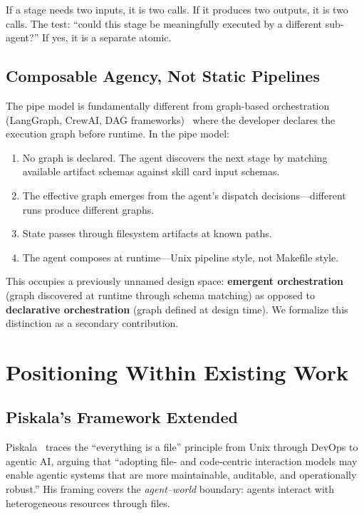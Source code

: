 \documentclass[11pt,a4paper]{article}
\begin{document}
If a stage needs two inputs, it is two calls. If it produces two outputs, it is two calls. The test: ``could this stage be meaningfully executed by a different sub-agent?'' If yes, it is a separate atomic.

\subsection{Composable Agency, Not Static Pipelines}
The pipe model is fundamentally different from graph-based orchestration (LangGraph, CrewAI, DAG frameworks)~\cite{azure2025} where the developer declares the execution graph before runtime. In the pipe model:

\begin{enumerate}[nosep]
  \item No graph is declared. The agent discovers the next stage by matching available artifact schemas against skill card input schemas.
  \item The effective graph emerges from the agent's dispatch decisions---different runs produce different graphs.
  \item State passes through filesystem artifacts at known paths.
  \item The agent composes at runtime---Unix pipeline style, not Makefile style.
\end{enumerate}

This occupies a previously unnamed design space: \textbf{emergent orchestration} (graph discovered at runtime through schema matching) as opposed to \textbf{declarative orchestration} (graph defined at design time). We formalize this distinction as a secondary contribution.

\section{Positioning Within Existing Work}
\label{sec:positioning}

\subsection{Piskala's Framework Extended}
Piskala~\cite{piskala2026} traces the ``everything is a file'' principle from Unix through DevOps to agentic AI, arguing that ``adopting file- and code-centric interaction models may enable agentic systems that are more maintainable, auditable, and operationally robust.'' His framing covers the \emph{agent--world} boundary: agents interact with heterogeneous resources through files.
\end{document}
